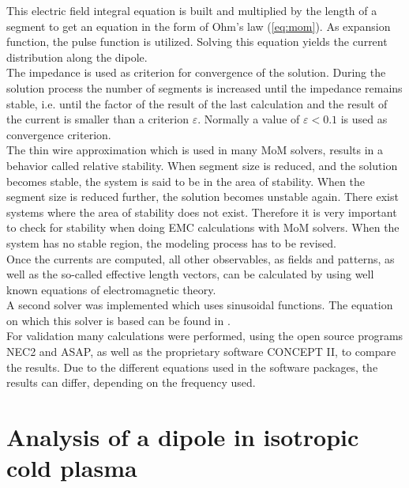\documentclass[draft,ras]{agutex}
\begin{document}
\begin{article}
This electric field integral equation is built and multiplied by the length of a segment to get an equation in the form of Ohm's law (\ref{eq:mom}). As expansion function, the pulse function is utilized. Solving this equation yields the current distribution along the dipole.\\

The impedance is used as criterion for convergence of the solution. During the solution process the number of segments is increased until the impedance remains stable, i.e. until the factor of the result of the last calculation and the result of the current is smaller than a criterion $\varepsilon$. Normally a value of $\varepsilon < 0.1$ is used as convergence criterion.\\

 The thin wire approximation which is used in many MoM solvers, results in a behavior called relative stability. When segment size is reduced, and the solution becomes stable, the system is said to be in the area of stability. When the segment size is reduced further, the solution becomes unstable again. There exist systems where the area of stability does not exist. Therefore it is very important to check for stability when doing EMC calculations with MoM solvers. When the system has no stable region, the modeling process has to be revised.\\

Once the currents are computed, all other observables, as fields and patterns, as well as the so-called effective length vectors, can be calculated by using well known equations of electromagnetic theory.\\

A second solver was implemented which uses sinusoidal functions. The equation on which this solver is based can be found in \cite{davidson}.\\

For validation many calculations were performed, using the open source programs NEC2 and ASAP, as well as the proprietary software CONCEPT II, to compare the results. Due to the different equations used in the software packages, the results can differ, depending on the frequency used.\\

\section{Analysis of a dipole in isotropic cold plasma}

\end{article}
\end{document}
